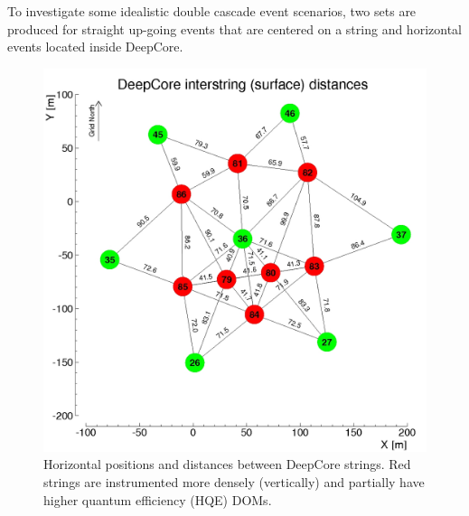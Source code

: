 To investigate some idealistic double cascade event scenarios, two sets are produced for straight up-going events that are centered on a string and horizontal events located inside DeepCore.

\begin{figure}[h]
    \centering
    \includegraphics{figures/icecube_deepcore/deepcore_surface_distances.jpg}
    \caption[DeepCore string spacing]{Horizontal positions and distances between DeepCore strings. Red strings are instrumented more densely (vertically) and partially have higher quantum efficiency (HQE) DOMs.}
\end{figure}

